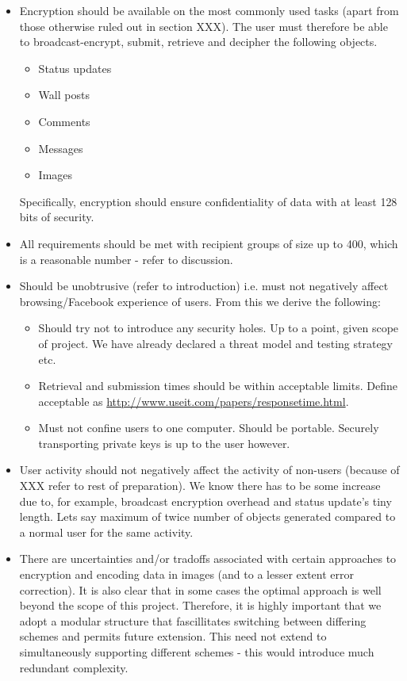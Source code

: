 \begin{itemize}

    \item Encryption should be available on the most commonly used tasks (apart from those otherwise ruled out in section XXX). The user must therefore be able to broadcast-encrypt, submit, retrieve and decipher the following objects.

    
    \begin{itemize}
        \item Status updates
        \item Wall posts
        \item Comments
        \item Messages
        \item Images
    \end{itemize}
    
    Specifically, encryption should ensure confidentiality of data with at least 128 bits of security.
    
    \item All requirements should be met with recipient groups of size up to 400, which is a reasonable number - refer to discussion.
    
    \item Should be unobtrusive (refer to introduction) i.e. must not negatively affect browsing/Facebook experience of users. From this we derive the following:
    \begin{itemize}
        \item Should try not to introduce any security holes. Up to a point, given scope of project. We have already declared a threat model and testing strategy etc.
        \item Retrieval and submission times should be within acceptable limits. Define acceptable as \url{http://www.useit.com/papers/responsetime.html}.
        \item Must not confine users to one computer. Should be portable. Securely transporting private keys is up to the user however.
    \end{itemize}
    
    \item User activity should not negatively affect the activity of non-users (because of XXX refer to rest of preparation). We know there has to be some increase due to, for example, broadcast encryption overhead and status update's tiny length. Lets say maximum of twice number of objects generated compared to a normal user for the same activity.

    \item There are uncertainties and/or tradoffs associated with certain approaches to encryption and encoding data in images (and to a lesser extent error correction). It is also clear that in some cases the optimal approach is well beyond the scope of this project. Therefore, it is highly important that we adopt a modular structure that fascillitates switching between differing schemes and permits future extension. This need not extend to simultaneously supporting different schemes - this would introduce much redundant complexity.
    
    
\end{itemize}